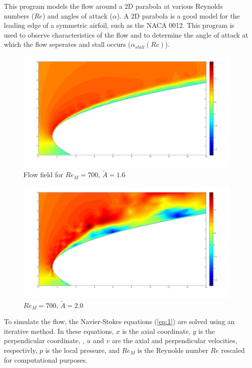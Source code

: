 This program models the flow around a 2D parabola at various Reynolds numbers ($Re$) and angles of attack ($\alpha$). A 2D parabola is a good model for the leading edge of a symmetric airfoil, such as the NACA 0012. This program is used to observe characteristics of the flow and to determine the angle of attack at which the flow seperates and stall occurs ($\alpha_{stall}(Re)$).

\begin{figure}[!ht]
\includegraphics[width=\textwidth]{FF1p6.pdf}
\caption{Flow field for $Re_M = 700$, $\tilde{A} = 1.6$}
\label{fig:FF1p6}
\end{figure}

\begin{figure}[!ht]
\includegraphics[width=\textwidth]{FF2p0.pdf}
\caption{$Re_M = 700$, $\tilde{A} = 2.0$}
\label{fig:FF2p0}
\end{figure}

To simulate the flow, the Navier-Stokes equations (\ref{eq:1}) are solved using an iterative method. In these equations, $x$ is the axial coordinate, $y$ is the perpendicular coordinate, , $u$ and $v$ are the axial and perpendicular velocities, respectivly, $p$ is the local pressure, and $Re_M$ is the Reynolds number $Re$ rescaled for computational purposes.

